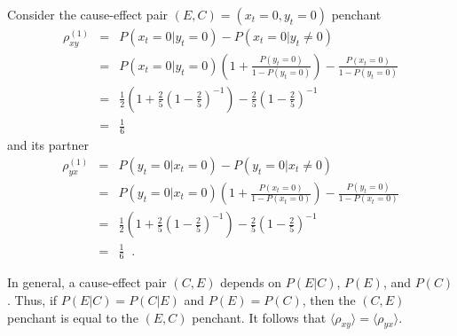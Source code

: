 \documentclass[a4paper,11pt]{article}
\begin{document}
Consider the cause-effect pair $(E,C)=(x_t=0,y_t=0)$ penchant
\begin{eqnarray}
\rho_{xy}^{(1)} &=& P(x_t = 0 | y_t = 0) - P(x_t = 0 | y_t \neq 0)\\
&=&  P(x_t = 0 | y_t = 0)\left(1+\frac{P(y_t = 0)}{1-P(y_t = 0)}\right)-\frac{P(x_t = 0)}{1-P(y_t = 0)}\\
&=& \frac{1}{2}\left(1+\frac{2}{5}\left(1-\frac{2}{5}\right)^{-1}\right)-\frac{2}{5}\left(1-\frac{2}{5}\right)^{-1}\\
&=& \frac{1}{6}
\end{eqnarray}
and its partner
\begin{eqnarray}
\rho_{yx}^{(1)} &=& P(y_t = 0 | x_t = 0) - P(y_t = 0 | x_t \neq 0)\\
&=& P(y_t = 0|x_t = 0)\left(1+\frac{P(x_t = 0)}{1-P(x_t = 0)}\right)-\frac{P(y_t = 0)}{1-P(x_t = 0)}\\
&=& \frac{1}{2}\left(1+\frac{2}{5}\left(1-\frac{2}{5}\right)^{-1}\right)-\frac{2}{5}\left(1-\frac{2}{5}\right)^{-1}\\
&=& \frac{1}{6}\;\;.
\end{eqnarray}

In general, a cause-effect pair $(C,E)$ depends on $P(E|C)$, $P(E)$, and $P(C)$.  Thus, if $P(E|C)=P(C|E)$ and $P(E)=P(C)$, then the $(C,E)$ penchant is equal to the $(E,C)$ penchant.  It follows that $\langle \rho_{xy} \rangle = \langle \rho_{yx} \rangle$.
\end{document}
